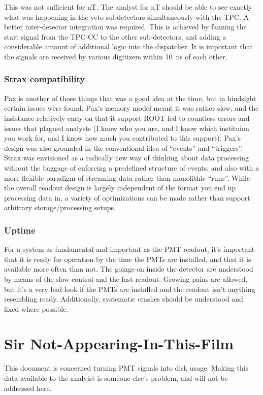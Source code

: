 This was not sufficient for nT.
The analyst for nT should be able to see exactly what was happening in the veto subdetectors simultaneously with the TPC.
A better inter-detector integration was required.
This is achieved by fanning the start signal from the TPC CC to the other sub-detectors, and adding a considerable amount of additional logic into the dispatcher.
It is important that the signals are received by various digitizers within \SI{10}{\nano\second} of each other.

\subsubsection{Strax compatibility}

Pax is another of those things that was a good idea at the time, but in hindsight certain issues were found.
Pax's memory model meant it was rather slow, and the insistance relatively early on that it support ROOT led to countless errors and issues that plagued analysts (I know who you are, and I know which instituion you work for, and I know how much you contributed to this support).
Pax's design was also grounded in the conventional idea of ``events'' and ``triggers''.
Strax was envisioned as a radically new way of thinking about data processing without the baggage of enforcing a predefined structure of events, and also with a more flexible paradigm of streaming data rather than monolithic ``runs''.
While the overall readout design is largely independent of the format you end up processing data in, a variety of optimizations can be made rather than support arbitrary storage/processing setups.

\subsubsection{Uptime}

For a system as fundamental and important as the PMT readout, it's important that it is ready for operation by the time the PMTs are installed, and that it is available more often than not.
The goings-on inside the detector are understood by means of the slow control and the fast readout.
Growing pains are allowed, but it's a very bad look if the PMTs are installed and the readout isn't anything resembling ready.
Additionally, systematic crashes should be understood and fixed where possible.

\section{Sir Not-Appearing-In-This-Film}

This document is concerned turning PMT signals into disk usage.
Making this data available to the analyist is someone else's problem, and will not be addressed here.
